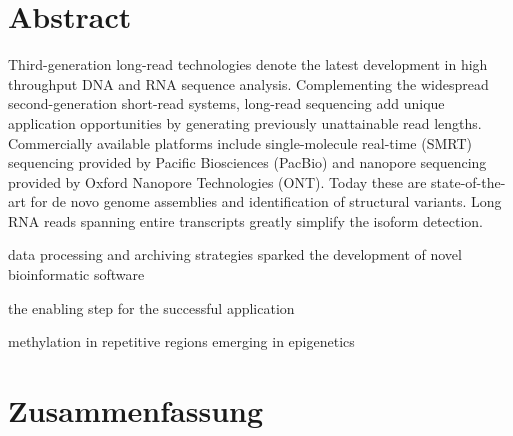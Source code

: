 
\chapter*{Abstract}
\label{sec:abstract}
\vspace*{-10mm}

Third-generation long-read technologies denote the latest development in high throughput DNA and RNA sequence analysis.
Complementing the widespread second-generation short-read systems, long-read sequencing add unique application opportunities by generating previously unattainable read lengths.
Commercially available platforms include single-molecule real-time (SMRT) sequencing provided by Pacific Biosciences (PacBio) and nanopore sequencing provided by Oxford Nanopore Technologies (ONT).
Today these are state-of-the-art for de novo genome assemblies and identification of structural variants.
Long RNA reads spanning entire transcripts greatly simplify the isoform detection.

data processing and archiving strategies
sparked the development of novel bioinformatic software

the enabling step for the successful application

methylation in repetitive regions
emerging in epigenetics





\cleardoublepage
\chapter*{Zusammenfassung}
\label{sec:zusammenfassung}
\vspace*{-10mm}


